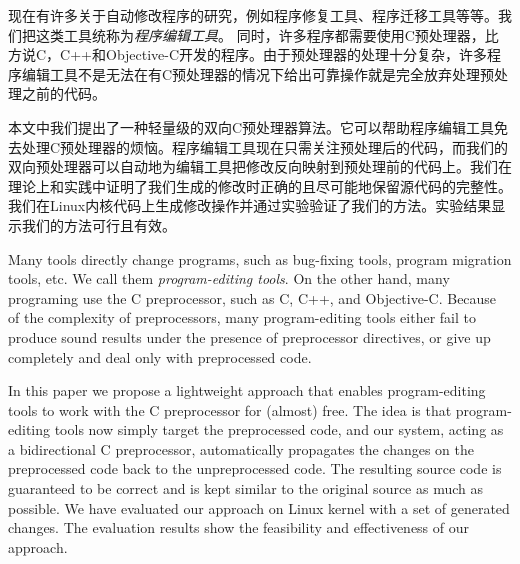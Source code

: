 
\begin{cabstract}
现在有许多关于自动修改程序的研究，例如程序修复工具、程序迁移工具等等。我们把这类工具统称为\emph{程序编辑工具}。
同时，许多程序都需要使用C预处理器，比方说C，C++和Objective-C开发的程序。由于预处理器的处理十分复杂，许多程序编辑工具不是无法在有C预处理器的情况下给出可靠操作就是完全放弃处理预处理之前的代码。

本文中我们提出了一种轻量级的双向C预处理器算法。它可以帮助程序编辑工具免去处理C预处理器的烦恼。程序编辑工具现在只需关注预处理后的代码，而我们的双向预处理器可以自动地为编辑工具把修改反向映射到预处理前的代码上。我们在理论上和实践中证明了我们生成的修改时正确的且尽可能地保留源代码的完整性。我们在Linux内核代码上生成修改操作并通过实验验证了我们的方法。实验结果显示我们的方法可行且有效。
\end{cabstract}

\begin{eabstract}
Many tools directly change programs, such as bug-fixing tools, program migration tools, etc. We call them \emph{program-editing tools}. On the other hand, many programing use the C preprocessor, such as C, C++, and Objective-C. Because of the complexity of preprocessors, many program-editing tools either fail to produce sound results under the presence of preprocessor directives, or give up completely and deal only with preprocessed code.

In this paper we propose a lightweight approach that enables program-editing tools to work with the C preprocessor for (almost) free. The idea is that program-editing tools now simply target the preprocessed code, and our system, acting as a bidirectional C preprocessor, automatically propagates the changes on the preprocessed code back to the unpreprocessed code. The resulting source code is guaranteed to be correct and is kept similar to the original source as much as possible. We have evaluated our approach on Linux kernel with a set of generated changes. The evaluation results show the feasibility and effectiveness of our approach.
\end{eabstract}

